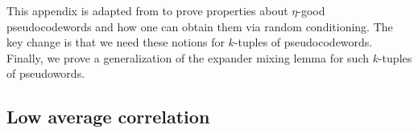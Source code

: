
This appendix is adapted from \cite{JST23} to prove properties about $\eta$-good pseudocodewords and how one can obtain them via random conditioning. The key change is that we need these notions for $k$-tuples of pseudocodewords. Finally, we prove a generalization of the expander mixing lemma for such $k$-tuples of pseudowords.





\subsection{Low average correlation}


